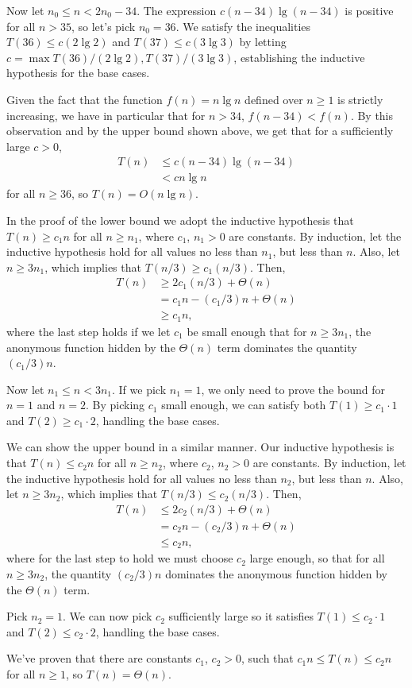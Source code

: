 Now let $n_0\le n<2n_0-34$.
The expression $c(n-34)\lg(n-34)$ is positive for all $n>35$, so let's pick $n_0=36$.
We satisfy the inequalities $T(36)\le c(2\lg2)$ and $T(37)\le c(3\lg3)$ by letting $c=\max{T(36)/(2\lg2),T(37)/(3\lg3)}$, establishing the inductive hypothesis for the base cases.

Given the fact that the function $f(n)=n\lg n$ defined over $n\ge1$ is strictly increasing, we have in particular that for $n>34$, $f(n-34)<f(n)$.
By this observation and by the upper bound shown above, we get that for a sufficiently large $c>0$,
\begin{align*}
    T(n) &\le c(n-34)\lg(n-34) \\
    &< cn\lg n
\end{align*}
for all $n\ge36$, so $T(n)=O(n\lg n)$.

\subexercise
In the proof of the lower bound we adopt the inductive hypothesis that $T(n)\ge c_1n$ for all $n\ge n_1$, where $c_1$, $n_1>0$ are constants.
By induction, let the inductive hypothesis hold for all values no less than $n_1$, but less than $n$.
Also, let $n\ge3n_1$, which implies that $T(n/3)\ge c_1(n/3)$.
Then,
\begin{align*}
    T(n) &\ge 2c_1(n/3)+\Theta(n) \\
    &= c_1n-(c_1/3)n+\Theta(n) \\
    &\ge c_1n,
\end{align*}
where the last step holds if we let $c_1$ be small enough that for $n\ge3n_1$, the anonymous function hidden by the $\Theta(n)$ term dominates the quantity $(c_1/3)n$.

Now let $n_1\le n<3n_1$.
If we pick $n_1=1$, we only need to prove the bound for $n=1$ and $n=2$.
By picking $c_1$ small enough, we can satisfy both $T(1)\ge c_1\cdot1$ and $T(2)\ge c_1\cdot2$, handling the base cases.

We can show the upper bound in a similar manner.
Our inductive hypothesis is that $T(n)\le c_2n$ for all $n\ge n_2$, where $c_2$, $n_2>0$ are constants.
By induction, let the inductive hypothesis hold for all values no less than $n_2$, but less than $n$.
Also, let $n\ge3n_2$, which implies that $T(n/3)\le c_2(n/3)$.
Then,
\begin{align*}
    T(n) &\le 2c_2(n/3)+\Theta(n) \\
    &= c_2n-(c_2/3)n+\Theta(n) \\
    &\le c_2n,
\end{align*}
where for the last step to hold we must choose $c_2$ large enough, so that for all $n\ge3n_2$, the quantity $(c_2/3)n$ dominates the anonymous function hidden by the $\Theta(n)$ term.

Pick $n_2=1$.
We can now pick $c_2$ sufficiently large so it satisfies $T(1)\le c_2\cdot1$ and $T(2)\le c_2\cdot2$, handling the base cases.

We've proven that there are constants $c_1$, $c_2>0$, such that $c_1n\le T(n)\le c_2n$ for all $n\ge1$, so $T(n)=\Theta(n)$.

\subexercise
{}
\bignegskip\bignegskip
